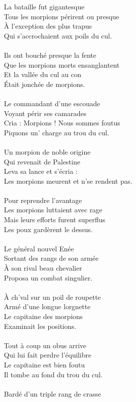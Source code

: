 La bataille fut gigantesque
\\Tous les morpions périrent ou presque
\\À l'exception des plus trapus
\\Qui s'accrochaient aux poils du cul.
\\\\Ils ont bouché presque la fente
\\Que les morpions morts ensanglantent
\\Et la vallée du cul au con
\\Était jonchée de morpions.
\\\\Le commandant d'une escouade
\\Voyant périr ses camarades
\\Cria : Morpions ! Nous sommes foutus
\\Piquons un' charge au trou du cul.
\\\\Un morpion de noble origine
\\Qui revenait de Palestine
\\Leva sa lance et s'écria :
\\Les morpions meurent et n'se rendent pas.
\\\\Pour reprendre l'avantage
\\Les morpions luttaient avec rage
\\Mais leurs efforts furent superflus
\\Les poux gardèrent le dessus.
\\\\Le général nouvel Enée
\\Sortant des rangs de son armée
\\À son rival beau chevalier
\\Proposa un combat singulier.
\\\\À ch'val sur un poil de roupette
\\Armé d'une longue lorgnette
\\Le capitaine des morpions
\\Examinait les positions.
\\\\Tout à coup un obus arrive
\\Qui lui fait perdre l'équilibre
\\Le capitaine est bien foutu
\\Il tombe au fond du trou du cul.
\breakpage
\\\\Bardé d'un triple rang de crasse
